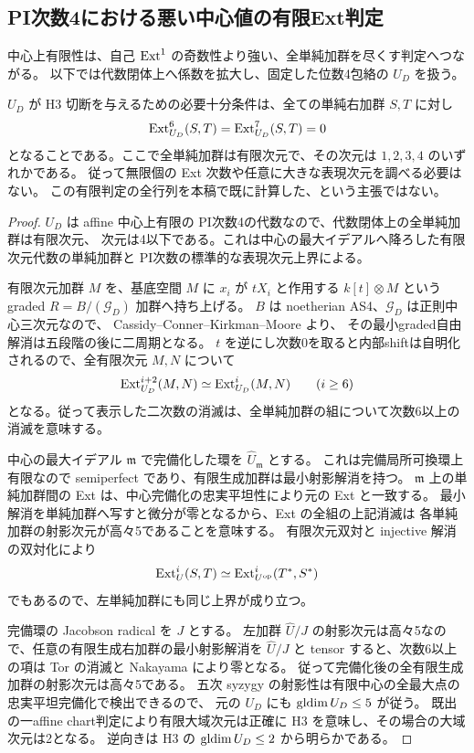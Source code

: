 \subsection{PI次数4における悪い中心値の有限Ext判定}
\label{subsec:order4-finite-ext-test}
中心上有限性は、自己 $\operatorname{Ext}^1$ の奇数性より強い、全単純加群を尽くす判定へつながる。
以下では代数閉体上へ係数を拡大し、固定した位数4包絡の $U_D$ を扱う。

\begin{proposition}[二つのExt次数と四次元以下の単純加群]
\label{prop:order4-six-seven-test}
$U_D$ が H3 切断を与えるための必要十分条件は、全ての単純右加群 $S,T$ に対し
\[
 \operatorname{Ext}^6_{U_D}(S,T)=\operatorname{Ext}^7_{U_D}(S,T)=0
\]
となることである。ここで全単純加群は有限次元で、その次元は $1,2,3,4$ のいずれかである。
従って無限個の Ext 次数や任意に大きな表現次元を調べる必要はない。
この有限判定の全行列を本稿で既に計算した、という主張ではない。
\end{proposition}
\begin{proof}
$U_D$ は affine 中心上有限の PI次数4の代数なので、代数閉体上の全単純加群は有限次元、
次元は4以下である。これは中心の最大イデアルへ降ろした有限次元代数の単純加群と
PI次数の標準的な表現次元上界による。

有限次元加群 $M$ を、基底空間 $M$ に $x_i$ が $tX_i$ と作用する
$k[t]\otimes M$ という graded $R=B/(\mathcal G_D)$ 加群へ持ち上げる。
$B$ は noetherian AS4、$\mathcal G_D$ は正則中心三次元なので、
Cassidy--Conner--Kirkman--Moore \cite[Theorem 4.7(1),(2)]{CCKMcut}より、
その最小graded自由解消は五段階の後に二周期となる。
$t$ を逆にし次数0を取ると内部shiftは自明化されるので、全有限次元 $M,N$ について
\[
 \operatorname{Ext}^{i+2}_{U_D}(M,N)\simeq\operatorname{Ext}^i_{U_D}(M,N)\qquad(i\ge6)
\]
となる。従って表示した二次数の消滅は、全単純加群の組について次数6以上の消滅を意味する。

中心の最大イデアル $\mathfrak m$ で完備化した環を $\widehat U_{\mathfrak m}$ とする。
これは完備局所可換環上有限なので semiperfect であり、有限生成加群は最小射影解消を持つ。
$\mathfrak m$ 上の単純加群間の Ext は、中心完備化の忠実平坦性により元の Ext と一致する。
最小解消を単純加群へ写すと微分が零となるから、Ext の全組の上記消滅は
各単純加群の射影次元が高々5であることを意味する。
有限次元双対と injective 解消の双対化により
\[
 \operatorname{Ext}^i_U(S,T)\simeq\operatorname{Ext}^i_{U^{\mathrm{op}}}(T^*,S^*)
\]
でもあるので、左単純加群にも同じ上界が成り立つ。

完備環の Jacobson radical を $J$ とする。
左加群 $\widehat U/J$ の射影次元は高々5なので、任意の有限生成右加群の最小射影解消を
$\widehat U/J$ と tensor すると、次数6以上の項は Tor の消滅と Nakayama により零となる。
従って完備化後の全有限生成加群の射影次元は高々5である。
五次 syzygy の射影性は有限中心の全最大点の忠実平坦完備化で検出できるので、
元の $U_D$ にも $\operatorname{gldim} U_D\le5$ が従う。
既出の一affine chart判定により有限大域次元は正確に H3 を意味し、その場合の大域次元は2となる。
逆向きは H3 の $\operatorname{gldim} U_D\le2$ から明らかである。
\end{proof}

